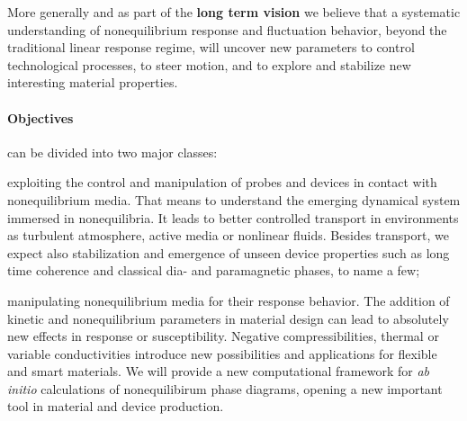 More generally and as part of the {\bf long term vision} we believe that a systematic
understanding of nonequilibrium response and fluctuation behavior, beyond the traditional
linear response regime, will uncover new parameters to control technological processes, to
steer motion, and to explore and stabilize new interesting material properties.

\paragraph{Objectives}

can be divided into two major classes:\newline
\begin{inparaenum}[A.]
\item exploiting the control and manipulation of probes and devices in contact with nonequilibrium media.  That means to understand the emerging dynamical system immersed in nonequilibria.  It leads to better controlled transport in environments as turbulent atmosphere, active media or nonlinear fluids.  Besides transport, we expect also stabilization and emergence of unseen device properties such as long time coherence and classical dia- and paramagnetic phases, to name a few;\newline
\item manipulating nonequilibrium media for their response behavior.  The addition of kinetic and nonequilibrium parameters in material design can lead to absolutely new effects in response or susceptibility. Negative compressibilities, thermal or variable conductivities introduce new possibilities and applications for flexible and smart materials.  We will provide a new computational framework for {\it ab initio} calculations of nonequilibirum phase diagrams, opening a new important tool in material and device production.
\end{inparaenum}


